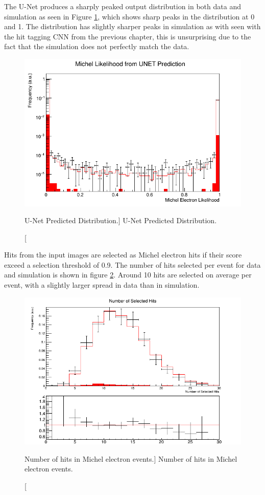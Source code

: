 The U-Net produces a sharply peaked output distribution in both data and
simulation as seen in Figure \ref{fig:unet_pred_data}, which shows sharp peaks
in the distribution at 0 and 1. The distribution has slightly sharper peaks in 
simulation as with seen with the hit tagging CNN from the previous chapter, this
is unsurprising due to the fact that the simulation does not perfectly match the
data. 
\begin{figure}
	\centering
	\includegraphics[width=\textwidth]{figures/unet_pred_data.png}
	\caption
	[U-Net Predicted Distribution.]
	{U-Net Predicted Distribution.}
	\label{fig:unet_pred_data}
\end{figure}

Hits from the input images are selected as Michel electron hits if their score
exceed a selection threshold of 0.9. The number of hits selected per event for
data and simulation is shown in figure \ref{fig:mich_n_hits}. Around 10 hits are
selected on average per event, with a slightly larger spread in data than in
simulation.
\begin{figure}
	\centering
	\includegraphics[width=\textwidth]{figures/mich_n_hits.png}
	\caption
	[Number of hits in Michel electron events.]
	{Number of hits in Michel electron events.}
	\label{fig:mich_n_hits}
\end{figure}

